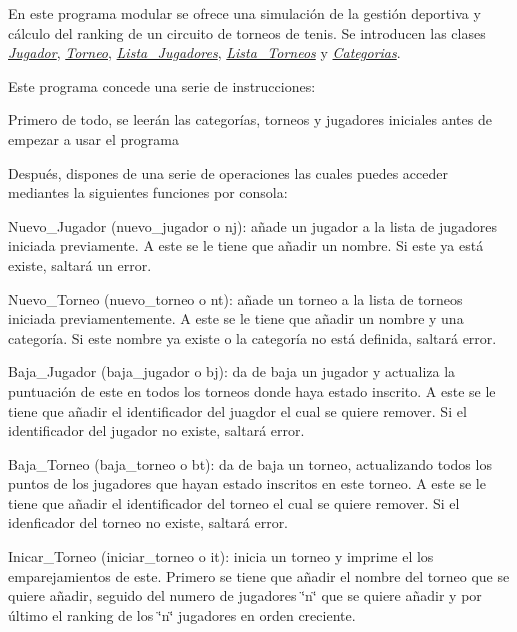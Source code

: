 En este programa modular se ofrece una simulación de la gestión deportiva y cálculo del ranking de un circuito de torneos de tenis. Se introducen las clases {\itshape \mbox{\hyperlink{class_jugador}{Jugador}}}, {\itshape \mbox{\hyperlink{class_torneo}{Torneo}}}, {\itshape \mbox{\hyperlink{class_lista___jugadores}{Lista\+\_\+\+Jugadores}}}, {\itshape \mbox{\hyperlink{class_lista___torneos}{Lista\+\_\+\+Torneos}}} y {\itshape \mbox{\hyperlink{class_categorias}{Categorias}}}.

Este programa concede una serie de instrucciones\+:
\begin{DoxyItemize}
\item Primero de todo, se leerán las categorías, torneos y jugadores iniciales antes de empezar a usar el programa
\item Después, dispones de una serie de operaciones las cuales puedes acceder mediantes la siguientes funciones por consola\+:
\begin{DoxyItemize}
\item Nuevo\+\_\+\+Jugador (nuevo\+\_\+jugador o nj)\+: añade un jugador a la lista de jugadores iniciada previamente. A este se le tiene que añadir un nombre. Si este ya está existe, saltará un error.
\item Nuevo\+\_\+\+Torneo (nuevo\+\_\+torneo o nt)\+: añade un torneo a la lista de torneos iniciada previamentemente. A este se le tiene que añadir un nombre y una categoría. Si este nombre ya existe o la categoría no está definida, saltará error.
\item Baja\+\_\+\+Jugador (baja\+\_\+jugador o bj)\+: da de baja un jugador y actualiza la puntuación de este en todos los torneos donde haya estado inscrito. A este se le tiene que añadir el identificador del juagdor el cual se quiere remover. Si el identificador del jugador no existe, saltará error.
\item Baja\+\_\+\+Torneo (baja\+\_\+torneo o bt)\+: da de baja un torneo, actualizando todos los puntos de los jugadores que hayan estado inscritos en este torneo. A este se le tiene que añadir el identificador del torneo el cual se quiere remover. Si el idenficador del torneo no existe, saltará error.
\item Inicar\+\_\+\+Torneo (iniciar\+\_\+torneo o it)\+: inicia un torneo y imprime el los emparejamientos de este. Primero se tiene que añadir el nombre del torneo que se quiere añadir, seguido del numero de jugadores \char`\"{}n\char`\"{} que se quiere añadir y por último el ranking de los \char`\"{}n\char`\"{} jugadores en orden creciente.

\end{DoxyItemize}
\end{DoxyItemize}
